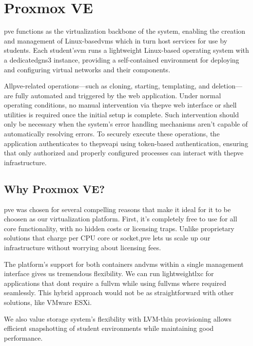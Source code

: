 \section{Proxmox VE}

    \ac{pve} functions as the virtualization backbone of the system, enabling the creation and management of Linux-based\ac{vm}s 
    which in turn host services for use by students. Each student's\ac{vm} runs a lightweight Linux-based operating system with a 
    dedicated\ac{gns3} instance, providing a self-contained environment for deploying and configuring virtual networks 
    and their components.

    All\ac{pve}-related operations—such as cloning, starting, templating, and deletion—are fully automated and triggered by the 
    web application. Under normal operating conditions, no manual intervention via the\ac{pve} web interface or shell utilities 
    is required once the initial setup is complete. Such intervention should only be necessary when the system's error handling 
    mechanisms aren't capable of automatically resolving errors. To securely execute these operations, the application 
    authenticates to the\ac{pve}\ac{api} using token-based authentication, ensuring that only authorized and properly configured 
    processes can interact with the\ac{pve} infrastructure.

    \subsection{Why Proxmox VE?}

        \ac{pve} was chosen for several compelling reasons that make it ideal for it to be choosen as our virtualization platform. First, 
        it's completely free to use for all core functionality, with no hidden costs or licensing traps. Unlike proprietary solutions that 
        charge per CPU core or socket,\ac{pve} lets us scale up our infrastructure without worrying about licensing fees.

        The platform's support for both containers and\ac{vm}s within a single management interface gives us tremendous flexibility. We 
        can run lightweight\ac{lxc} for applications that dont require a full\ac{vm} while using full\ac{vm}s where required seamlessly. 
        This hybrid approach would not be as straightforward with other solutions, like VMware ESXi.

        We also value storage system's flexibility with LVM-thin provisioning allows efficient snapshotting of student environments while 
        maintaining good performance.

